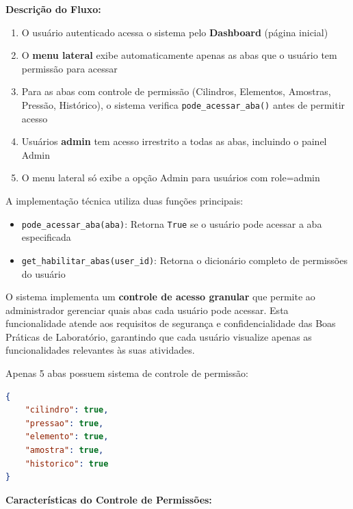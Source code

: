\documentclass[12pt,a4paper]{article}
\providecommand\关键字[1]{\textbf{#1}}
\begin{document}
\textbf{Descrição do Fluxo:}

\begin{enumerate}
\item O usuário autenticado acessa o sistema pelo \textbf{Dashboard} (página inicial)
\item O \textbf{menu lateral} exibe automaticamente apenas as abas que o usuário tem permissão para acessar
\item Para as abas com controle de permissão (Cilindros, Elementos, Amostras, Pressão, Histórico), o sistema verifica \texttt{pode\_acessar\_aba()} antes de permitir acesso
\item Usuários \textbf{admin} tem acesso irrestrito a todas as abas, incluindo o painel Admin
\item O menu lateral só exibe a opção Admin para usuários com role=admin
\end{enumerate}

A implementação técnica utiliza duas funções principais:
\begin{itemize}
\item \texttt{pode\_acessar\_aba(aba)}: Retorna \texttt{True} se o usuário pode acessar a aba especificada
\item \texttt{get\_habilitar\_abas(user\_id)}: Retorna o dicionário completo de permissões do usuário
\end{itemize}


O sistema implementa um \textbf{controle de acesso granular} que permite ao administrador gerenciar quais abas cada usuário pode acessar. Esta funcionalidade atende aos requisitos de segurança e confidencialidade das Boas Práticas de Laboratório, garantindo que cada usuário visualize apenas as funcionalidades relevantes às suas atividades.

Apenas 5 abas possuem sistema de controle de permissão:

\begin{lstlisting}[language=JSON, caption=JSON de Permissões]
{
    "cilindro": true,
    "pressao": true,
    "elemento": true,
    "amostra": true,
    "historico": true
}
\end{lstlisting}

\textbf{Características do Controle de Permissões:}
\end{document}
